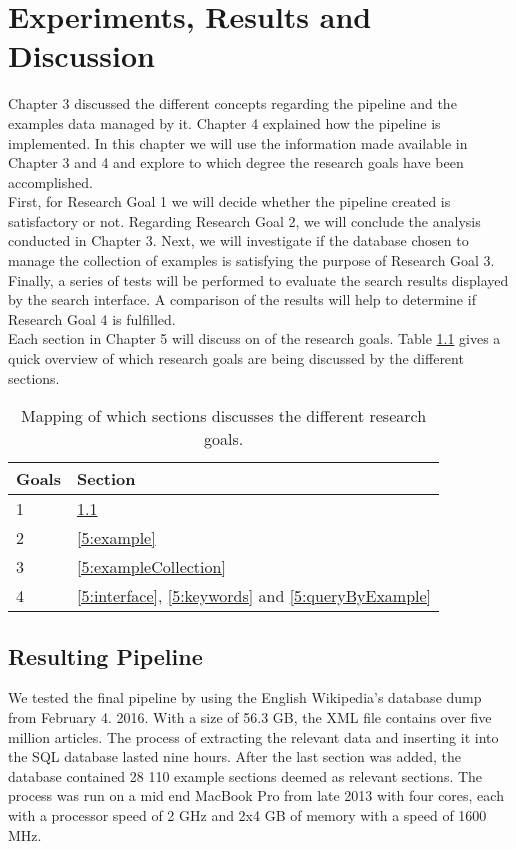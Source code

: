 
\chapter{Experiments, Results and Discussion} \label{cap_5}


Chapter 3 discussed the different concepts regarding the pipeline and the examples data managed by it. Chapter 4 explained how the pipeline is implemented. In this chapter we will use the information made available in Chapter 3 and 4 and explore to which degree the research goals have been accomplished.\\
First, for Research Goal 1 we will decide whether the pipeline created is satisfactory or not. Regarding Research Goal 2, we will conclude the analysis conducted in Chapter 3. Next, we will investigate if the database chosen to manage the collection of examples is satisfying the purpose of Research Goal 3. Finally, a series of tests will be performed to evaluate the search results displayed by the search interface. A comparison of the results will help to determine if Research Goal 4 is fulfilled. \\
Each section in Chapter 5 will discuss on of the research goals. Table \ref{table:rgSecMapping} gives a quick overview of which research goals are being discussed by the different sections.

\begin{table}[h]
\centering
\begin{tabular} {|| p{5em} | p{10em} ||} 
 \hline
  Goals & Section \\ [0.5ex] 
 \hline
1   &   \ref{5:pipeline} \\
2   &   \ref{5:example} \\
3   &   \ref{5:exampleCollection} \\
4   &   \ref{5:interface}, \ref{5:keywords} and \ref{5:queryByExample} \\
 \hline
\end{tabular}
\caption{Mapping of which sections discusses the different research goals.}
\label{table:rgSecMapping}
\end{table}

\section{Resulting Pipeline} \label{5:pipeline}

We tested the final pipeline by using the English Wikipedia's database dump from February 4. 2016. With a size of 56.3 GB, the XML file contains over five million articles. The process of extracting the relevant data and inserting it into the SQL database lasted nine hours. After the last section was added, the database contained 28 110 example sections deemed as relevant sections. The process was run on a mid end MacBook Pro from late 2013 with four cores, each with a processor speed of 2 GHz and 2x4 GB of memory with a speed of 1600 MHz.

